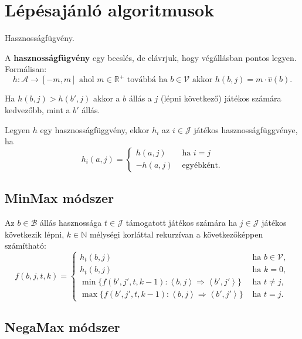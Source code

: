 \section{Lépésajánló algoritmusok}

\begin{definicio}
    Hasznosságfügvény.

    A {\bf hasznosságfügvény} egy becslés, de elávrjuk, hogy végállásban pontos
    legyen. Formálisan: \[
        h  : \mathcal{A} \to [-m, m] \text{ ahol } m \in \mathbb{R}^+
        \text{ továbbá ha } b \in \mathcal{V} \text{ akkor }
        h(b,j) = m \cdot \hat{v}(b)
    .\]

    Ha $h(b,j) > h(b', j)$ akkor a $b$ állás a $j$ (lépni következő) játékos
    számára kedvezőbb, mint a $b'$ állás.

    Legyen $h$ egy hasznosságfüggvény, ekkor $h_i$ az $i \in \mathcal{J}$ játékos
    hasznosságfüggvénye, ha \[
        h_i(a,j) = \begin{cases}
            h(a,j) & \text{ ha } i = j \\
            -h(a,j) & \text{ egyébként.}
        \end{cases}
    \]
\end{definicio}

\subsection{MinMax módszer}

Az $b \in \mathcal{B}$ állás hasznossága $t \in \mathcal{J}$ támogatott játékos
számára ha $j \in \mathcal{J}$ játékos következik lépni, $k \in \mathbb{N}$
mélységi korláttal rekurzívan a következőképpen számítható:
\[
    f(b, j, t, k) =
    \begin{cases}
        h_t(b,j) & \text{ ha } b \in \mathcal{V} ,\\
        h_t(b,j) & \text{ ha } k = 0 ,\\
        \min \{ f(b', j', t, k-1) : \left<b, j \right> \Rightarrow \left<b', j' \right>\}
        & \text{ ha } t \neq j ,\\
        \max \{ f(b', j', t, k-1) : \left<b, j \right> \Rightarrow \left<b', j' \right>\}
        & \text{ ha } t = j.
    \end{cases}
\]

\subsection{NegaMax módszer}

